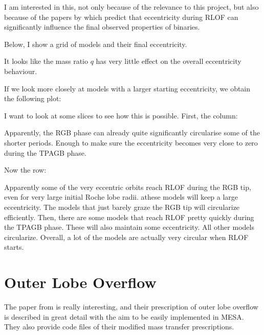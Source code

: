 \documentclass[a4paper,10pt]{article}
\begin{document}
I am interested in this, not only because of the relevance to this project, but also because of the papers by \citeauthor{parkosidis2025a} which predict that eccentricity during RLOF can significantly influence the final observed properties of binaries.

Below, I show a grid of models and their final eccentricity.
\begin{figure}[ht]
    \centering
\end{figure}
It looks like the mass ratio \(q\) has very little effect on the overall eccentricity behaviour.

If we look more closely at models with a larger starting eccentricity, we obtain the following plot:
\begin{figure}[ht]
    \centering
\end{figure}

I want to look at some slices to see how this is possible. First, the column:

\begin{figure}[ht]
    \centering
\end{figure}

Apparently, the RGB phase can already quite significantly circularise some of the shorter periods. Enough to make sure the eccentricity becomes very close to zero during the TPAGB phase.

Now the row:
\begin{figure}[ht]
    \centering
\end{figure}

Apparently some of the very eccentric orbits reach RLOF during the RGB tip, even for very large initial Roche lobe radii. athese models will keep a large eccentricity. The models that just barely graze the RGB tip will circularize efficiently. Then, there are some models that reach RLOF pretty quickly during the TPAGB phase. These will also maintain some eccentricity. All other models circularize. Overall, a lot of the models are actually very circular when RLOF starts.

\section{Outer Lobe Overflow}
The paper from \citet{marchant2021} is really interesting, and their prescription of outer lobe overflow is described in great detail with the aim to be easily implemented in MESA. They also provide code files of their modified mass transfer prescriptions.
\end{document}
